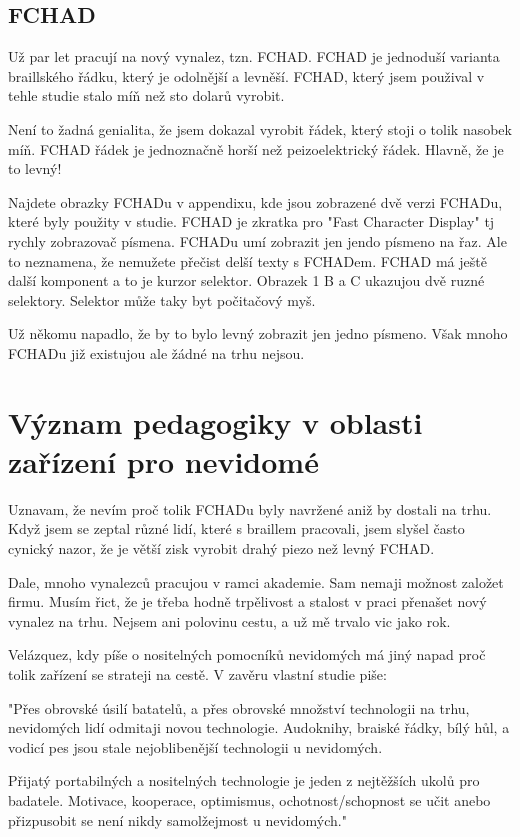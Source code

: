 \subsection{FCHAD}

Už par let pracují na nový vynalez, tzn. FCHAD. FCHAD je jednoduší varianta braillského řádku, který je odolnější a levněší.  FCHAD, který jsem použival v tehle studie stalo míň než sto dolarů vyrobit.

Není to žadná genialita, že jsem dokazal vyrobit řádek, který stoji o tolik nasobek míň.  FCHAD řádek je jednoznačně horší než peizoelektrický řádek.  Hlavně, že je to levný!

Najdete obrazky FCHADu v appendixu, kde jsou zobrazené dvě verzi FCHADu, které byly použity v studie.  FCHAD je zkratka pro "Fast Character Display" tj rychly zobrazovač písmena.  FCHADu umí zobrazit jen jendo písmeno na řaz.  Ale to neznamena, že nemužete přečist delší texty s FCHADem.  FCHAD má ještě další komponent a to je kurzor selektor.  Obrazek 1 B a C ukazujou dvě ruzné selektory.  Selektor může taky byt počitačový myš.

Už někomu napadlo, že by to bylo levný zobrazit jen jedno písmeno. Však mnoho FCHADu již existujou ale žádné na trhu nejsou.

\section{Význam pedagogiky v oblasti zařízení pro nevidomé}

Uznavam, že nevím proč tolik FCHADu byly navržené aniž by dostali na trhu.  Když jsem se zeptal různé lidí, které s braillem pracovali, jsem slyšel často cynický nazor, že je větší zisk vyrobit drahý piezo než levný FCHAD.

Dale, mnoho vynalezců pracujou v ramci akademie.  Sam nemaji možnost založet firmu.  Musím řict, že je třeba hodně trpělivost a stalost v praci přenašet nový vynalez na trhu.  Nejsem ani polovinu cestu, a už mě trvalo vic jako rok.

Velázquez, kdy píše o nositelných pomocníků nevidomých má jiný napad proč tolik zařízení se strateji na cestě.  V zavěru vlastní studie piše:

"Přes obrovské úsilí batatelů, a přes obrovské množství technologii na trhu, nevidomých lidí odmitaji novou technologie. Audoknihy, braiské řádky, bílý hůl, a vodicí pes jsou stale nejoblibenější technologii u nevidomých.

Přijatý portabilných a nositelných technologie je jeden z nejtěžších ukolů pro badatele.  Motivace, kooperace, optimismus, ochotnost/schopnost se učit anebo přizpusobit se není nikdy samolžejmost u nevidomých."\citep{velazquez2010wearable}%

